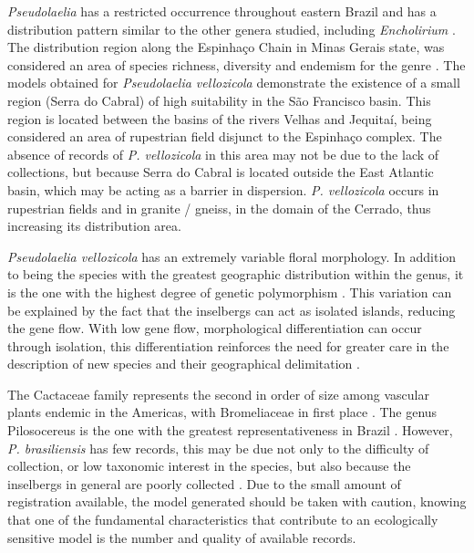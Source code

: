 \textit{Pseudolaelia} has a restricted occurrence throughout eastern Brazil and has a distribution pattern similar to the other genera studied, including \textit{Encholirium} \citep{meninineto2012BiogeographyConservationStatus}. The distribution region along the Espinhaço Chain in Minas Gerais state, was considered an area of species richness, diversity and endemism for the genre \citep{meninineto2012BiogeographyConservationStatus}. The models obtained for \textit{Pseudolaelia vellozicola} demonstrate the existence of a small region (Serra do Cabral) of high suitability in the São Francisco basin. This region is located between the basins of the rivers Velhas and Jequitaí, being considered an area of rupestrian field disjunct to the Espinhaço complex. The absence of records of \textit{P. vellozicola} in this area may not be due to the lack of collections, but because Serra do Cabral is located outside the East Atlantic basin, which may be acting as a barrier in dispersion. \textit{P. vellozicola} occurs in rupestrian fields and in granite / gneiss, in the domain of the Cerrado, thus increasing its distribution area.

\textit{Pseudolaelia vellozicola} has an extremely variable floral morphology. In addition to being the species with the greatest geographic distribution within the genus, it is the one with the highest degree of genetic polymorphism \citep{meninineto2013TaxonomicRevisionPseudolaelia}. This variation can be explained by the fact that the inselbergs can act as isolated islands, reducing the gene flow. With low gene flow, morphological differentiation can occur through isolation, this differentiation reinforces the need for greater care in the description of new species and their geographical delimitation \citep{barthlott2000WhyStudyInselbergs,meninineto2012BiogeographyConservationStatus}.

The Cactaceae family represents the second in order of size among vascular plants endemic in the Americas, with Bromeliaceae in first place \citep{zappi2011PlanoAcaoNacional}. The genus Pilosocereus is the one with the greatest representativeness in Brazil \citep{zappi1994PilosocereusCactaceaeGenus}. However, \textit{P. brasiliensis} has few records, this may be due not only to the difficulty of collection, or low taxonomic interest in the species, but also because the inselbergs in general are poorly collected \citep{depaula2016SugarLoafLand, porembski2007TropicalInselbergsHabitat}. Due to the small amount of registration available, the model generated should be taken with caution, knowing that one of the fundamental characteristics that contribute to an ecologically sensitive model is the number and quality of available records.

